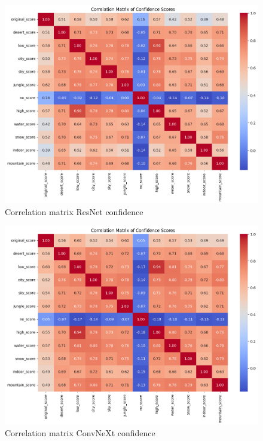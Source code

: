 \begin{figure}
	\centering\includegraphics[width=.9\textwidth]{img/correlation_matrix_res}
	\caption{Correlation matrix ResNet confidence}  
    \label{rys:correlation_resnet}
\end{figure}

\begin{figure}
	\centering\includegraphics[width=.9\textwidth]{img/correlation_matrix_conv}
	\caption{Correlation matrix ConvNeXt confidence}  
    \label{rys:correlation_convnext}
\end{figure}